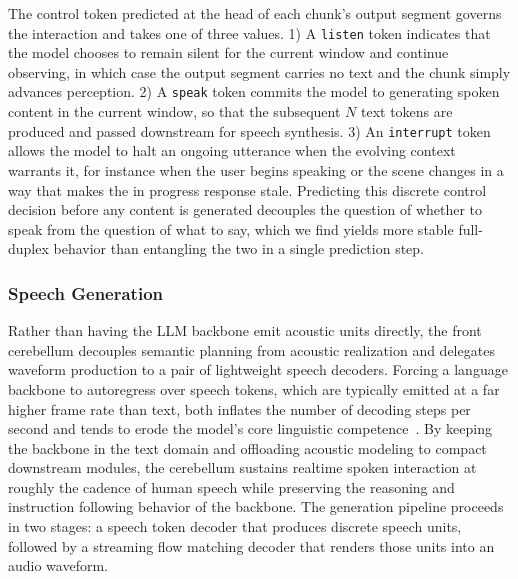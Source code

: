 The control token predicted at the head of each chunk's output segment governs the interaction and takes one of three values. 1) A \texttt{listen} token indicates that the model chooses to remain silent for the current window and continue observing, in which case the output segment carries no text and the chunk simply advances perception. 2) A \texttt{speak} token commits the model to generating spoken content in the current window, so that the subsequent $N$ text tokens are produced and passed downstream for speech synthesis. 3) An \texttt{interrupt} token allows the model to halt an ongoing utterance when the evolving context warrants it, for instance when the user begins speaking or the scene changes in a way that makes the in progress response stale. Predicting this discrete control decision before any content is generated decouples the question of whether to speak from the question of what to say, which we find yields more stable full-duplex behavior than entangling the two in a single prediction step.



\subsubsection{Speech Generation} \label{jsp:3}
Rather than having the LLM backbone emit acoustic units directly, the front cerebellum decouples semantic planning from acoustic realization and delegates waveform production to a pair of lightweight speech decoders. Forcing a language backbone to autoregress over speech tokens, which are typically emitted at a far higher frame rate than text, both inflates the number of decoding steps per second and tends to erode the model's core linguistic competence~\cite{xie2024miniomni2}. By keeping the backbone in the text domain and offloading acoustic modeling to compact downstream modules, the cerebellum sustains realtime spoken interaction at roughly the cadence of human speech while preserving the reasoning and instruction following behavior of the backbone. The generation pipeline proceeds in two stages: a speech token decoder that produces discrete speech units, followed by a streaming flow matching decoder that renders those units into an audio waveform.

\vspace{-0.5cm}

